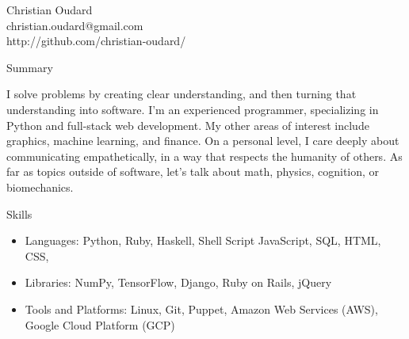 \documentclass[11pt,oneside]{article}
\newenvironment{ressection}[1]{
    \textrm{\Large#1}
    \begin{itemize}
}{
    \end{itemize}
}
\newcommand{\resitem}[1]{
    \item \begin{flushleft} \textsf{#1} \end{flushleft}
}
\begin{document}
\begin{center}
    \textrm{\Huge Christian Oudard} \\
    \vspace{4pt}
    \textsf{
        christian.oudard@gmail.com \\
        http://github.com/christian-oudard/
    }
\end{center}
\vspace{8pt} 

\textrm{\Large Summary}\par
\vspace{8pt}
\textsf{I solve problems by creating clear understanding, and then turning that understanding
into software. I'm an experienced programmer, specializing in Python and full-stack web
development. My other areas of interest include graphics, machine learning, and finance.
On a personal level, I care deeply about communicating empathetically, in a way that
respects the humanity of others. As far as topics outside of software, let's
talk about math, physics, cognition, or biomechanics.}

\vspace{12pt}


\begin{ressection}{Skills}
    \resitem{
        \textrm{Languages:}
        Python,
        Ruby,
        Haskell,
        Shell Script
        JavaScript,
        SQL,
        HTML,
        CSS,
    }

    \resitem{
        \textrm{Libraries:}
        NumPy,
        TensorFlow,
        Django,
        Ruby on Rails,
        jQuery
    }

    \resitem{
        \textrm{Tools and Platforms:}
        Linux,
        Git,
        Puppet,
        Amazon Web Services (AWS),
        Google Cloud Platform (GCP)
    }
\end{ressection}
\end{document}

